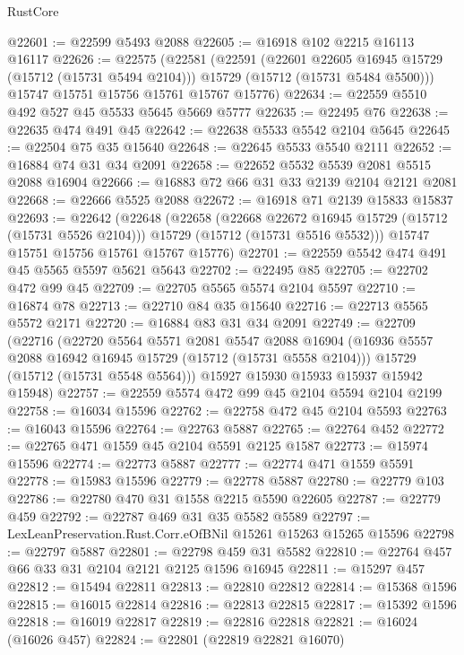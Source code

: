 \begin{lexlean}{RustCore}
\begin{coremodule}
@22601 := @22599 @5493 @2088
@22605 := @16918 @102 @2215 @16113 @16117
@22626 := @22575
    (@22581
      (@22591
        (@22601 @22605 @16945 @15729 (@15712 (@15731 @5494 @2104)))
        @15729
        (@15712 (@15731 @5484 @5500)))
      @15747
      @15751
      @15756
      @15761
      @15767
      @15776)
@22634 := @22559 @5510 @492 @527 @45 @5533 @5645 @5669 @5777
@22635 := @22495 @76
@22638 := @22635 @474 @491 @45
@22642 := @22638 @5533 @5542 @2104 @5645
@22645 := @22504 @75 @35 @15640
@22648 := @22645 @5533 @5540 @2111
@22652 := @16884 @74 @31 @34 @2091
@22658 := @22652 @5532 @5539 @2081 @5515 @2088 @16904
@22666 := @16883 @72 @66 @31 @33 @2139 @2104 @2121 @2081
@22668 := @22666 @5525 @2088
@22672 := @16918 @71 @2139 @15833 @15837
@22693 := @22642
    (@22648
      (@22658
        (@22668 @22672 @16945 @15729 (@15712 (@15731 @5526 @2104)))
        @15729
        (@15712 (@15731 @5516 @5532)))
      @15747
      @15751
      @15756
      @15761
      @15767
      @15776)
@22701 := @22559 @5542 @474 @491 @45 @5565 @5597 @5621 @5643
@22702 := @22495 @85
@22705 := @22702 @472 @99 @45
@22709 := @22705 @5565 @5574 @2104 @5597
@22710 := @16874 @78
@22713 := @22710 @84 @35 @15640
@22716 := @22713 @5565 @5572 @2171
@22720 := @16884 @83 @31 @34 @2091
@22749 := @22709
    (@22716
      (@22720
        @5564
        @5571
        @2081
        @5547
        @2088
        @16904
        (@16936 @5557 @2088 @16942 @16945 @15729 (@15712 (@15731 @5558 @2104)))
        @15729
        (@15712 (@15731 @5548 @5564)))
      @15927
      @15930
      @15933
      @15937
      @15942
      @15948)
@22757 := @22559 @5574 @472 @99 @45 @2104 @5594 @2104 @2199
@22758 := @16034 @15596
@22762 := @22758 @472 @45 @2104 @5593
@22763 := @16043 @15596
@22764 := @22763 @5887
@22765 := @22764 @452
@22772 := @22765 @471 @1559 @45 @2104 @5591 @2125 @1587
@22773 := @15974 @15596
@22774 := @22773 @5887
@22777 := @22774 @471 @1559 @5591
@22778 := @15983 @15596
@22779 := @22778 @5887
@22780 := @22779 @103
@22786 := @22780 @470 @31 @1558 @2215 @5590 @22605
@22787 := @22779 @459
@22792 := @22787 @469 @31 @35 @5582 @5589
@22797 := LexLeanPreservation.Rust.Corr.eOfBNil @15261 @15263 @15265 @15596
@22798 := @22797 @5887
@22801 := @22798 @459 @31 @5582
@22810 := @22764 @457 @66 @33 @31 @2104 @2121 @2125 @1596 @16945
@22811 := @15297 @457
@22812 := @15494 @22811
@22813 := @22810 @22812
@22814 := @15368 @1596
@22815 := @16015 @22814
@22816 := @22813 @22815
@22817 := @15392 @1596
@22818 := @16019 @22817
@22819 := @22816 @22818
@22821 := @16024 (@16026 @457)
@22824 := @22801 (@22819 @22821 @16070)

\end{coremodule}
\end{lexlean}
